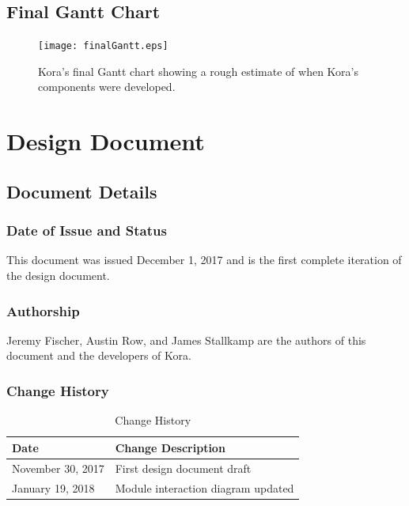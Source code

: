 \documentclass[onecolumn, draftclsnofoot,10pt, compsoc]{IEEEtran}
\def \botname{Kora\xspace}
\begin{document}
	\subsection{Final Gantt Chart}
		\begin{figure}[H]
			\texttt{[image: finalGantt.eps]}
			\centering
			\caption{Kora's final Gantt chart showing a rough estimate of when Kora's components were developed.}
		\end{figure}


















\section{Design Document}
	\subsection{Document Details}
	\subsubsection{Date of Issue and Status}
	This document was issued December 1, 2017 and is the first complete iteration of the design document.

	\subsubsection{Authorship}
	Jeremy Fischer, Austin Row, and James Stallkamp are the authors of this document and the developers of \botname.

	\subsubsection{Change History}
	\begin{table}[H]
		\centering
		\caption{Change History}
		\label{my-label}
		\begin{tabular}{|l|l|}
			\hline
			\textbf{Date}     & \textbf{Change Description}   \\ \hline
			November 30, 2017 & {First design document draft} \\ \hline
			January 19, 2018 & {Module interaction diagram updated} \\ \hline
		\end{tabular}
	\end{table}
\end{document}
